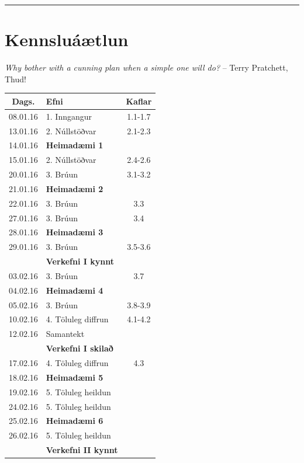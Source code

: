 \documentclass[A4paper,10pt,icelandic]{sphinxmanual}
\begin{document}
\newpage

\bigskip\hrule{}\bigskip



\section{Kennsluáætlun}
\label{vidauki:kennsluaaetlun}
\emph{Why bother with a cunning plan when a simple one will do?}
-- Terry Pratchett, Thud!

\begin{center}
\begin{tabular}{c|l|c}
Dags. &Efni&Kaflar\\
\hline
08.01.16 & 1.  Inngangur  &  1.1-1.7\\\hline
13.01.16 & 2. Núllstöðvar & 2.1-2.3\\
14.01.16 & \textbf{Heimadæmi 1} & \\
15.01.16 & 2. Núllstöðvar & 2.4-2.6\\\hline
20.01.16 & 3. Brúun & 3.1-3.2 \\
21.01.16 & \textbf{Heimadæmi 2} & \\
22.01.16 & 3. Brúun & 3.3\\\hline
27.01.16 & 3. Brúun & 3.4\\
28.01.16 & \textbf{Heimadæmi 3} & \\
29.01.16 & 3. Brúun & 3.5-3.6 \\
& \textbf{Verkefni I kynnt} & \\\hline
03.02.16 & 3. Brúun & 3.7 \\
04.02.16 & \textbf{Heimadæmi 4} &\\
05.02.16 & 3. Brúun & 3.8-3.9\\\hline
10.02.16 & 4. Töluleg diffrun & 4.1-4.2\\
12.02.16 & Samantekt & \\	
& \textbf{Verkefni I skilað}\\\hline
17.02.16 & 4. Töluleg diffrun & 4.3 \\
18.02.16 & \textbf{Heimadæmi 5} & \\
19.02.16 & 5. Töluleg heildun & \\\hline
24.02.16 & 5. Töluleg heildun & \\
25.02.16 & \textbf{Heimadæmi 6}&\\
26.02.16 & 5. Töluleg heildun & \\
 & \textbf{Verkefni II kynnt} & \\\hline

\end{tabular}
\end{center}
\end{document}
